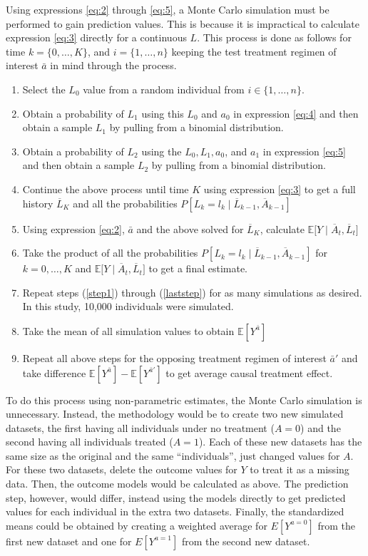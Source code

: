 \begin{enumerate}
Using expressions \ref{eq:2} through \ref{eq:5}, a Monte Carlo simulation must be performed to gain prediction values.  This is because it is impractical to calculate expression \ref{eq:3} directly for a continuous $L$.  This process is done as follows for time $k = \{ 0, \dots, K \}$, and $i = \{ 1, \dots, n \}$ keeping the test treatment regimen of interest $\bar{a}$ in mind through the process.  
\begin{enumerate} 
\item Select the $L_0$ value from a random individual from $i \in  \{ 1, \dots, n \}$. \label{step1}  
\item Obtain a probability of $L_1$ using this $L_0$ and $a_0$ in expression \ref{eq:4} and then obtain a sample $L_1$ by pulling from a binomial distribution.  
\item Obtain a probability of $L_2$ using the $L_0, L_1, a_0$, and $a_1$ in expression \ref{eq:5} and then obtain a sample $L_2$ by pulling from a binomial distribution.  
\item Continue the above process until time $K$ using expression \ref{eq:3} to get a full history $\overline{L}_K$ and all the probabilities $P[L_k = l_k \mid  \overline{L}_{k-1}, \overline{A}_{k-1}]$ 
\item Using expression \ref{eq:2}, $\bar{a}$ and the above solved for $\overline{L}_K$, calculate $\mathbb{E} \big[Y \mid \overline{A}_t, \overline{L}_t \big]$ 
\item Take the product of all the probabilities $P[L_k = l_k \mid  \overline{L}_{k-1}, \overline{A}_{k-1}]$ for $k = 0, \dots, K$ and $\mathbb{E} \big[Y \mid \overline{A}_t, \overline{L}_t \big]$ to get a final estimate.  \label{laststep}
\item Repeat steps (\ref{step1}) through (\ref{laststep}) for as many simulations as desired.  In this study, 10,000 individuals were simulated.    
\item Take the mean of all simulation values to obtain $\mathbb{E}[Y^{\bar{a}}]$ 
\item Repeat all above steps for the opposing treatment regimen of interest $\bar{a}'$ and take difference $\mathbb{E}[Y^{\bar{a}}] - \mathbb{E}[Y^{\bar{a}'}]$ to get average causal treatment effect.  
\end{enumerate}
\end{enumerate} 

To do this process using non-parametric estimates, the Monte Carlo simulation is unnecessary.  Instead, the methodology would be to create two new simulated datasets, the first having all individuals under no treatment ($A=0$) and the second having all individuals treated ($A=1$).  Each of these new datasets has the same size as the original and the same ``individuals'', just changed values for $A$.  For these two datasets, delete the outcome values for $Y$ to treat it as a missing data.  Then, the outcome models would be calculated as above.  The prediction step, however, would differ, instead using the models directly to get predicted values for each individual in the extra two datasets.  Finally, the standardized means could be obtained by creating a weighted average for $E[Y^{a=0}]$ from the first new dataset and one for $E[Y^{a=1}]$ from the second new dataset.  


